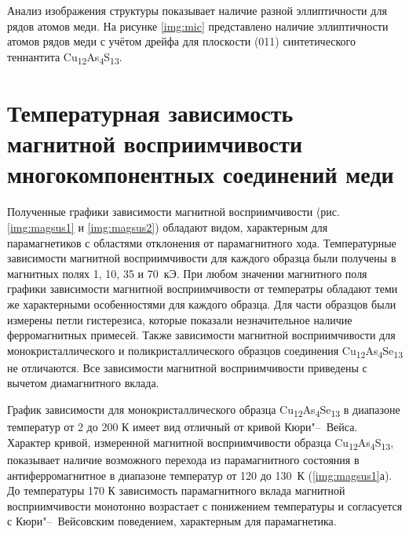 Анализ изображения структуры показывает наличие разной эллиптичности для рядов атомов меди. На рисунке \ref{img:mic} представлено наличие эллиптичности атомов рядов меди с учётом дрейфа для плоскости (011) синтетического теннантита Cu\textsubscript{12}As\textsubscript{4}S\textsubscript{13}.




\newpage

\section{Температурная зависимость магнитной восприимчивости многокомпонентных соединений меди} \label{sect3_3}

Полученные графики зависимости магнитной восприимчивости (рис. \ref{img:magsus1} и \ref{img:magsus2}) обладают видом, характерным для парамагнетиков с областями отклонения от парамагнитного хода.  Температурные зависимости магнитной восприимчивости для каждого образца были получены в магнитных полях 1, 10, 35 и 70~кЭ. При любом значении магнитного поля графики зависимости магнитной восприимчивости от температры обладают теми же характерными особенностями для каждого образца. Для части образцов были измерены петли гистерезиса, которые показали незначительное наличие ферромагнитных примесей. Также зависимости магнитной восприимчивости для монокристаллического и поликристаллического образцов соединения Cu\textsubscript{12}As\textsubscript{4}Se\textsubscript{13} не отличаются. Все зависимости магнитной восприимчивости приведены с вычетом диамагнитного вклада.

График зависимости для монокристаллического образца Cu\textsubscript{12}As\textsubscript{4}Se\textsubscript{13} в диапазоне температур от 2 до 200 К имеет вид отличный от кривой Кюри"--~Вейса.
 Характер кривой, измеренной магнитной восприимчивости образца  Cu\textsubscript{12}As\textsubscript{4}S\textsubscript{13}, показывает наличие возможного перехода из парамагнитного состояния в антиферромагнитное в диапазоне температур от 120 до 130~К (\ref{img:magsus1}а).
До температуры 170 К зависимость парамагнитного вклада магнитной восприимчивости монотонно возрастает с понижением температуры и согласуется с Кюри"--~Вейсовским поведением, характерным для парамагнетика.

